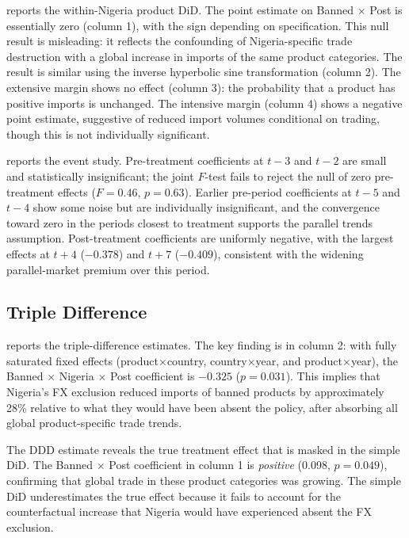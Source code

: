 \documentclass[12pt]{article}
\begin{document}


 reports the within-Nigeria product DiD. The point estimate on Banned $\times$ Post is essentially zero (column 1), with the sign depending on specification. This null result is misleading: it reflects the confounding of Nigeria-specific trade destruction with a global increase in imports of the same product categories. The result is similar using the inverse hyperbolic sine transformation (column 2). The extensive margin shows no effect (column 3): the probability that a product has positive imports is unchanged. The intensive margin (column 4) shows a negative point estimate, suggestive of reduced import volumes conditional on trading, though this is not individually significant.



 reports the event study. Pre-treatment coefficients at $t-3$ and $t-2$ are small and statistically insignificant; the joint $F$-test fails to reject the null of zero pre-treatment effects ($F = 0.46$, $p = 0.63$). Earlier pre-period coefficients at $t-5$ and $t-4$ show some noise but are individually insignificant, and the convergence toward zero in the periods closest to treatment supports the parallel trends assumption. Post-treatment coefficients are uniformly negative, with the largest effects at $t+4$ ($-0.378$) and $t+7$ ($-0.409$), consistent with the widening parallel-market premium over this period.

\subsection{Triple Difference}



 reports the triple-difference estimates. The key finding is in column 2: with fully saturated fixed effects (product$\times$country, country$\times$year, and product$\times$year), the Banned $\times$ Nigeria $\times$ Post coefficient is $-0.325$ ($p = 0.031$). This implies that Nigeria's FX exclusion reduced imports of banned products by approximately 28\% relative to what they would have been absent the policy, after absorbing all global product-specific trade trends.

The DDD estimate reveals the true treatment effect that is masked in the simple DiD. The Banned $\times$ Post coefficient in column 1 is \textit{positive} (0.098, $p = 0.049$), confirming that global trade in these product categories was growing. The simple DiD underestimates the true effect because it fails to account for the counterfactual increase that Nigeria would have experienced absent the FX exclusion.
\end{document}
